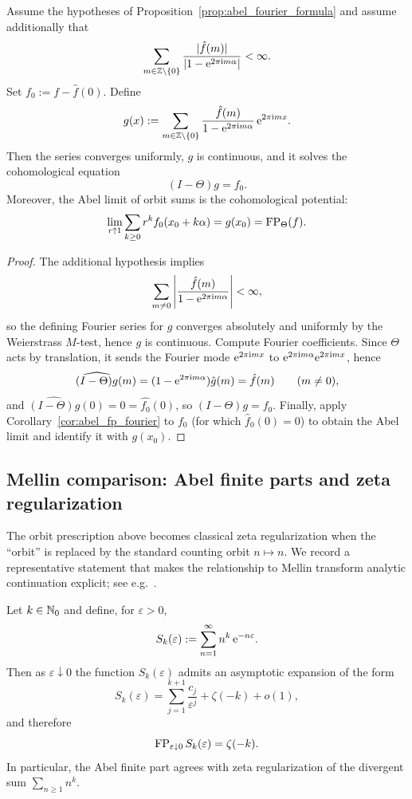 \begin{proposition}
\label{prop:cohomological_fp}
Assume the hypotheses of Proposition~\ref{prop:abel_fourier_formula} and assume additionally that
$$
\sum_{m\in\mathbb{Z}\setminus\{0\}}\frac{|\hat f(m)|}{|1-\mathrm{e}^{2\pi\mathrm{i} m\alpha}|}<\infty.
$$
Set $f_0:=f-\hat f(0)$.
Define
$$
g(x):=\sum_{m\in\mathbb{Z}\setminus\{0\}}\frac{\hat f(m)}{1-\mathrm{e}^{2\pi\mathrm{i} m\alpha}}\,\mathrm{e}^{2\pi\mathrm{i} m x}.
$$
Then the series converges uniformly, $g$ is continuous, and it solves the cohomological equation
$$
(I-\Theta)g=f_0.
$$
Moreover, the Abel limit of orbit sums is the cohomological potential:
$$
\lim_{r\uparrow 1}\sum_{k\ge 0} r^k f_0(x_0+k\alpha)=g(x_0)=\mathrm{FP}_\Theta(f).
$$
\end{proposition}

\begin{proof}
The additional hypothesis implies
$$
\sum_{m\ne 0}\left|\frac{\hat f(m)}{1-\mathrm{e}^{2\pi\mathrm{i} m\alpha}}\right|<\infty,
$$
so the defining Fourier series for $g$ converges absolutely and uniformly by the Weierstrass $M$-test, hence $g$ is continuous.
Compute Fourier coefficients. Since $\Theta$ acts by translation, it sends the Fourier mode $\mathrm{e}^{2\pi\mathrm{i} m x}$ to $\mathrm{e}^{2\pi\mathrm{i} m\alpha}\mathrm{e}^{2\pi\mathrm{i} m x}$, hence
$$
\widehat{(I-\Theta)g}(m)=(1-\mathrm{e}^{2\pi\mathrm{i} m\alpha})\hat g(m)=\hat f(m)\qquad (m\ne 0),
$$
and $\widehat{(I-\Theta)g}(0)=0=\widehat{f_0}(0)$, so $(I-\Theta)g=f_0$.
Finally, apply Corollary~\ref{cor:abel_fp_fourier} to $f_0$ (for which $\hat f_0(0)=0$) to obtain the Abel limit and identify it with $g(x_0)$.
\end{proof}

\subsection{Mellin comparison: Abel finite parts and zeta regularization}
\label{subsec:mellin_zeta_fp}
The orbit prescription above becomes classical zeta regularization when the ``orbit'' is replaced by the standard counting orbit $n\mapsto n$.
We record a representative statement that makes the relationship to Mellin transform analytic continuation explicit; see e.g.~\cite{FlajoletGourdonDumas1995,Hardy1949}.

\begin{theorem}
\label{thm:abel_fp_zeta}
Let $k\in\mathbb{N}_0$ and define, for $\varepsilon>0$,
$$
S_k(\varepsilon):=\sum_{n=1}^{\infty} n^k\,\mathrm{e}^{-n\varepsilon}.
$$
Then as $\varepsilon\downarrow 0$ the function $S_k(\varepsilon)$ admits an asymptotic expansion of the form
$$
S_k(\varepsilon)=\sum_{j=1}^{k+1}\frac{c_j}{\varepsilon^j}+\zeta(-k)+o(1),
$$
and therefore
$$
\mathrm{FP}_{\varepsilon\downarrow 0}\,S_k(\varepsilon)=\zeta(-k).
$$
In particular, the Abel finite part agrees with zeta regularization of the divergent sum $\sum_{n\ge 1}n^k$.
\end{theorem}

